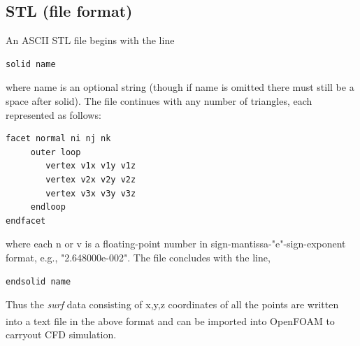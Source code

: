 \subsection{STL (file format)}
An ASCII STL file begins with the line
\begin{lstlisting}
solid name
\end{lstlisting}



where name is an optional string (though if name is omitted there must still be a space after solid). The file continues with any number of triangles, each represented as follows:
\begin{lstlisting}
facet normal ni nj nk 
	 outer loop	
		vertex v1x v1y v1z 
		vertex v2x v2y v2z 
		vertex v3x v3y v3z 
	 endloop 
endfacet 
\end{lstlisting}

where each n or v is a floating-point number in sign-mantissa-"e"-sign-exponent format, e.g., "2.648000e-002". The file concludes with the line,


\begin{lstlisting}
endsolid name
\end{lstlisting}

Thus the \textit{surf} data consisting of x,y,z coordinates of all the points are written into a text file in the above format and can be imported into OpenFOAM\textsuperscript{\textregistered} to carryout CFD simulation.



